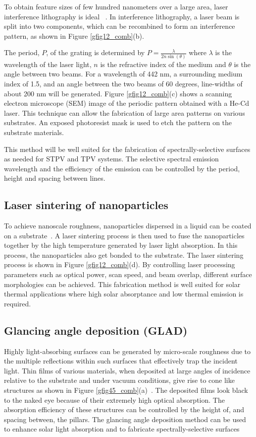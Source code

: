 \documentclass[review]{elsarticle}
\begin{document}
To obtain feature sizes of few hundred nanometers over a large area, laser interference lithography is ideal ~\cite{g30}. In interference lithography, a laser beam is split into two components, which can be recombined to form an interference pattern,  as shown in Figure \ref{gfig12_comb}(b). 

The period, $P$,  of the grating is determined by $P =\frac{\lambda}{2n\sin(\theta)}$ where  $\lambda$ is the wavelength of the laser light, $n$ is the refractive index of the medium and $\theta$ is the angle between two beams. For a wavelength of 442 nm, a surrounding medium index of 1.5, and an angle between the two beams of 60 degrees, line-widths of about 200 nm will be generated.  
Figure \ref{gfig12_comb}(c) shows a scanning electron microscope (SEM) image of the periodic pattern obtained with a He-Cd laser. This technique can allow the fabrication of large area patterns on various substrates. An exposed photoresist mask is used to etch the pattern on the substrate materials. 

This method will be well suited for the fabrication of spectrally-selective surfaces as 
needed for STPV and TPV systems.  The selective spectral emission wavelength and the 
efficiency of the emission can be controlled by the period, height and spacing between lines.

\subsection{Laser sintering of nanoparticles}
To achieve nanoscale roughness, nanoparticles dispersed in a liquid can be coated on a substrate~\cite{LaserProcessing}. A laser sintering process is then used to fuse the nanoparticles together by the high temperature generated by laser light absorption. In this process, the nanoparticles also get bonded to the substrate. The laser sintering process is shown in Figure \ref{gfig12_comb}(d).  By controlling laser processing parameters such as optical power, scan speed, and beam overlap, different surface morphologies can be achieved. This fabrication method is well suited for solar thermal applications where high solar absorptance and low thermal emission is required.

\subsection{Glancing angle deposition (GLAD)}
Highly light-absorbing surfaces can be generated by micro-scale roughness 
due to the multiple reflections within such surfaces that effectively trap the incident light.  
Thin films of various materials, when deposited at large angles of incidence
relative to the substrate and under vacuum conditions, give rise to cone like 
structures as shown in Figure \ref{gfig45_comb}(a)~\cite{GlancingAngle}. The deposited films look black to the 
naked eye because of their extremely high optical absorption.  The absorption efficiency of 
these structures can be controlled by the height of, and spacing between, the pillars.  
The glancing angle deposition method can be used to enhance solar light absorption 
and to fabricate spectrally-selective surfaces
\end{document}

